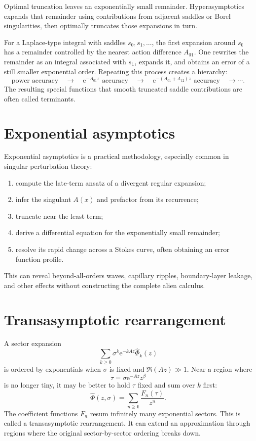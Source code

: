 \documentclass[11pt,oneside]{book}
\theoremstyle{definition}
\theoremstyle{remark}
\newcommand{\e}{\mathrm{e}}
\newcommand{\phihat}{\widehat{\Phi}}
\begin{document}
Optimal truncation leaves an exponentially small remainder. Hyperasymptotics
expands that remainder using contributions from adjacent saddles or Borel
singularities, then optimally truncates those expansions in turn.

For a Laplace-type integral with saddles $s_0,s_1,\ldots$, the first expansion
around $s_0$ has a remainder controlled by the nearest action difference
$A_{01}$. One rewrites the remainder as an integral associated with $s_1$,
expands it, and obtains an error of a still smaller exponential order. Repeating
this process creates a hierarchy:
\[
  \text{power accuracy}
  \quad\longrightarrow\quad
  \e^{-A_{01}z}\text{ accuracy}
  \quad\longrightarrow\quad
  \e^{-(A_{01}+A_{12})z}\text{ accuracy}
  \quad\longrightarrow\cdots.
\]
The resulting special functions that smooth truncated saddle contributions are
often called terminants.

\section{Exponential asymptotics}

Exponential asymptotics is a practical methodology, especially common in
singular perturbation theory:
\begin{enumerate}
\item compute the late-term ansatz of a divergent regular expansion;
\item infer the singulant $A(x)$ and prefactor from its recurrence;
\item truncate near the least term;
\item derive a differential equation for the exponentially small remainder;
\item resolve its rapid change across a Stokes curve, often obtaining an error
function profile.
\end{enumerate}
This can reveal beyond-all-orders waves, capillary ripples, boundary-layer
leakage, and other effects without constructing the complete alien calculus.

\section{Transasymptotic rearrangement}

A sector expansion
\[
  \sum_{k\ge0}\sigma^k\e^{-kAz}\phihat_k(z)
\]
is ordered by exponentials when $\sigma$ is fixed and $\Re(Az)\gg1$. Near a
region where
\[
  \tau=\sigma\e^{-Az}z^\beta
\]
is no longer tiny, it may be better to hold $\tau$ fixed and sum over $k$ first:
\begin{equation}
  \widehat\Phi(z,\sigma)
  =\sum_{n\ge0}\frac{F_n(\tau)}{z^n}.
  \label{eq:transasymptotic-rearrangement}
\end{equation}
The coefficient functions $F_n$ resum infinitely many exponential sectors. This
is called a transasymptotic rearrangement. It can extend an approximation through
regions where the original sector-by-sector ordering breaks down.
\end{document}
